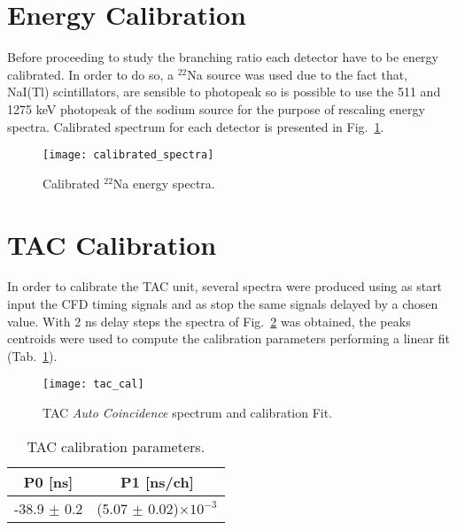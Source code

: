 \section*{Energy Calibration}

Before proceeding to study the branching ratio each detector have to be energy calibrated. In order to do so, a $^{22}$Na source was used due to the fact that, NaI(Tl) scintillators, are sensible to photopeak so is possible to use the 511 and  1275 keV photopeak of the sodium source for the purpose of rescaling energy spectra. Calibrated spectrum for each detector is presented in Fig.~\ref{Fig: calibrated spectra}.

\begin{figure}[H]
\centering
\texttt{[image: calibrated\_spectra]}
\caption{Calibrated $^{22}$Na energy spectra.}
\label{Fig: calibrated spectra}
\end{figure}


\section*{TAC Calibration}

In order to calibrate the TAC unit, several spectra were produced using as start
input the CFD timing signals and as stop the same signals delayed by a chosen
value. With 2 ns delay steps the spectra of Fig.~\ref{Fig: tac calibration} was obtained, the peaks
centroids were used to compute the calibration parameters performing a linear fit (Tab.~\ref{Tab: tac calibration parameters}).

\begin{figure}[H]
\centering
\texttt{[image: tac\_cal]}
\caption{TAC \textit{Auto Coincidence} spectrum and calibration Fit.}
\label{Fig: tac calibration}
\end{figure}
\begin{table}[H]
\centering
\begin{tabular}{cc}
\toprule
P0 [ns] & P1 [ns/ch] \\
\midrule
-38.9 $\pm$ 0.2 & (5.07 $\pm$ 0.02)$\times 10^{-3}$\\
\bottomrule
\end{tabular}
\caption{TAC calibration parameters.}
\label{Tab: tac calibration parameters}
\end{table}
